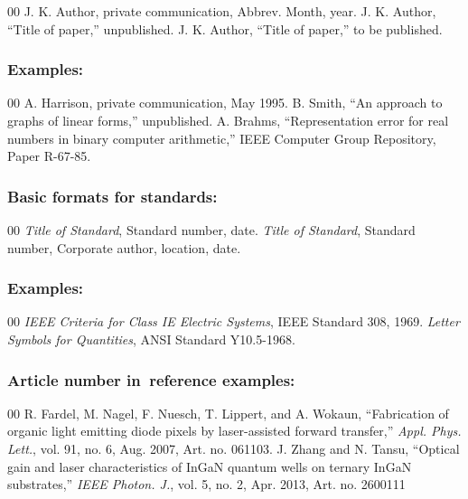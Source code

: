 \documentclass{IEEEoj-data}
\begin{document}
{\begin{thebibliography}{00}
 J. K. Author, private communication, Abbrev. Month, year.
 J. K. Author, ``Title of paper,'' unpublished.
 J. K. Author, ``Title of paper,'' to be published.
\end{thebibliography}

\subsubsection*{Examples:}

\begin{thebibliography}{00}
 A. Harrison, private communication, May 1995.
 B. Smith, ``An approach to graphs of linear forms,'' unpublished.
 A. Brahms, ``Representation error for real numbers in binary computer arithmetic,'' IEEE Computer Group Repository, Paper R-67-85.
\end{thebibliography}

\subsubsection*{Basic formats for standards:}

\begin{thebibliography}{00}
 \textit{Title of Standard}, Standard number, date.
 \textit{Title of Standard}, Standard number, Corporate author, location, date.
\end{thebibliography}

\subsubsection*{Examples:}

\begin{thebibliography}{00}
 \emph{IEEE Criteria for Class IE Electric Systems}, IEEE Standard 308, 1969.
 \emph{Letter Symbols for Quantities}, ANSI Standard Y10.5-1968.
\end{thebibliography}

\subsubsection*{Article number in~reference examples:}

\begin{thebibliography}{00}
 R. Fardel, M. Nagel, F. Nuesch, T. Lippert, and A. Wokaun, ``Fabrication of organic light emitting diode pixels by laser-assisted forward transfer,'' \textit{Appl. Phys. Lett.}, vol. 91, no. 6, Aug. 2007, Art. no. 061103.
 J. Zhang and N. Tansu, ``Optical gain and laser characteristics of InGaN quantum wells on ternary InGaN substrates,'' \textit{IEEE Photon. J.}, vol. 5, no. 2, Apr. 2013, Art. no. 2600111
\end{thebibliography}

}
\end{document}
